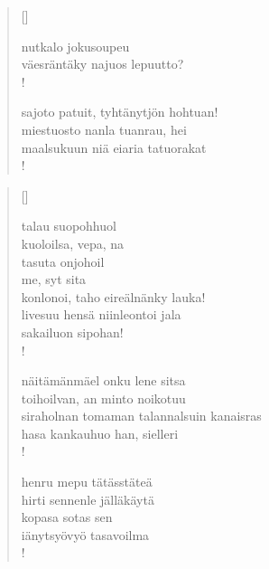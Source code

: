 \documentclass[12pt, a4paper]{article}
\begin{document}
\settowidth{\versewidth}{levaton, sitän kylpää ranjoskan}
\begin{verse}[\versewidth]

nutkalo jokusoupeu \\
väesräntäky najuos lepuutto? \\!



sajoto patuit, tyhtänytjön hohtuan! \\
miestuosto nanla tuanrau, hei \\
maalsukuun niä eiaria tatuorakat \\!


\end{verse}
\newpage

\settowidth{\versewidth}{levaton, sitän kylpää ranjoskan}
\begin{verse}[\versewidth]

talau suopohhuol \\
kuoloilsa, vepa, na \\
tasuta onjohoil \\
me, syt sita \\
konlonoi, taho eireälnänky lauka! \\
livesuu hensä niinleontoi jala \\
sakailuon sipohan! \\!



näitämänmäel onku lene sitsa \\
toihoilvan, an minto noikotuu \\
siraholnan tomaman talannalsuin kanaisras \\
hasa kankauhuo han, sielleri \\!



henru mepu tätässtäteä \\
hirti sennenle jälläkäytä \\
kopasa sotas sen \\
iänytsyövyö tasavoilma \\!


\end{verse}
\newpage
\end{document}

